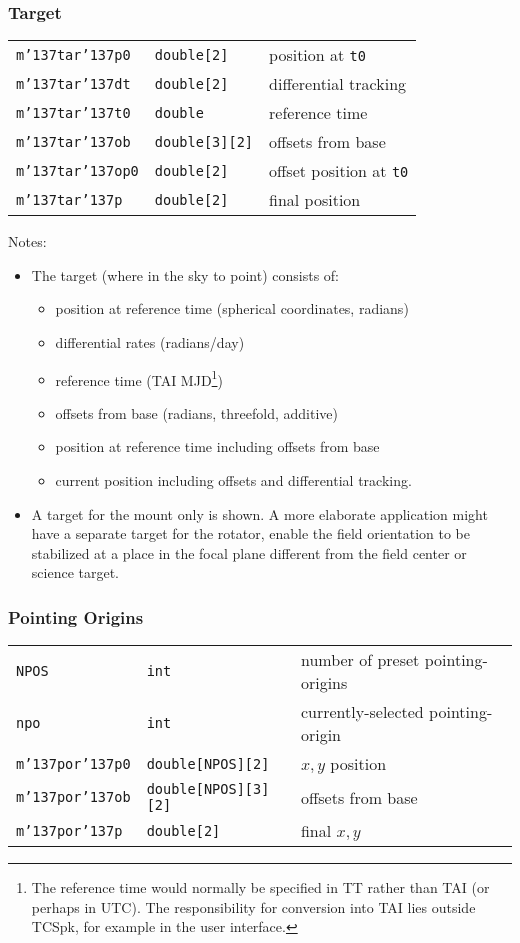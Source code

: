 \documentclass[12pt,fleqn,twoside]{article}
\renewcommand{\_}{{\tt\char'137}}     %
\newcommand{\notelist}  {\goodbreak \vspace{1ex} Notes:
                        \vspace{-3ex}}
\begin{document}
\subsubsection{Target}
\begin{tabular}{lll}
{\tt m\_tar\_p0} & {\tt double[2]} & position at {\tt t0} \\
{\tt m\_tar\_dt} & {\tt double[2]} & differential tracking \\
{\tt m\_tar\_t0} & {\tt double} & reference time \\
{\tt m\_tar\_ob} & {\tt double[3][2]} & offsets from base \\
{\tt m\_tar\_op0} & {\tt double[2]} & offset position at {\tt t0} \\
{\tt m\_tar\_p} & {\tt double[2]} & final position \\
\end{tabular}

\notelist
\begin{itemize}
\item The target (where in the sky to point) consists of:
      \begin{itemize}
      \item position at reference time (spherical coordinates, radians)
      \item differential rates (radians/day)
      \item reference time (TAI MJD\footnote{The reference time would
            normally be specified in TT rather than TAI (or perhaps in
            UTC).  The responsibility for conversion into TAI
            lies outside TCSpk, for example in the user interface.})
      \item offsets from base (radians, threefold, additive)
      \item position at reference time including offsets from base
      \item current position including offsets and differential tracking.
      \end{itemize}
\item A target for the mount only is shown.  A more elaborate
      application might have a separate target for the rotator,
      enable the field orientation to be stabilized at a place
      in the focal plane different from the field center or
      science target.
\end{itemize}

\subsubsection{Pointing Origins}
\begin{tabular}{lll}
{\tt NPOS} & {\tt int} & number of preset pointing-origins \\
{\tt npo} & {\tt int} & currently-selected pointing-origin \\
{\tt m\_por\_p0} & {\tt double[NPOS][2]} & $x,y$ position \\
{\tt m\_por\_ob} & {\tt double[NPOS][3][2]} & offsets from base \\
{\tt m\_por\_p} & {\tt double[2]} & final $x,y$ \\
\end{tabular}
\end{document}
